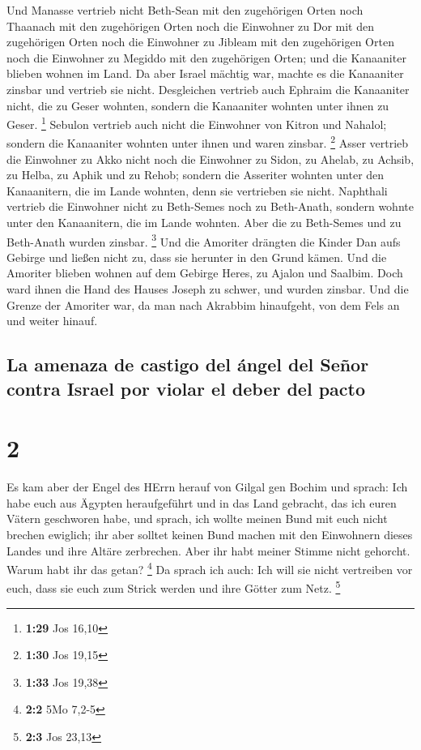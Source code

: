  Und Manasse vertrieb nicht Beth-Sean mit den zugehörigen
Orten noch Thaanach mit den zugehörigen Orten noch die Einwohner zu Dor
mit den zugehörigen Orten noch die Einwohner zu Jibleam mit den
zugehörigen Orten noch die Einwohner zu Megiddo mit den zugehörigen
Orten; und die Kanaaniter blieben wohnen im Land.  Da
aber Israel mächtig war, machte es die Kanaaniter zinsbar und vertrieb
sie nicht.  Desgleichen vertrieb auch Ephraim die
Kanaaniter nicht, die zu Geser wohnten, sondern die Kanaaniter wohnten
unter ihnen zu Geser. \footnote{\textbf{1:29} Jos 16,10} 
Sebulon vertrieb auch nicht die Einwohner von Kitron und Nahalol;
sondern die Kanaaniter wohnten unter ihnen und waren zinsbar.
\footnote{\textbf{1:30} Jos 19,15}  Asser vertrieb die
Einwohner zu Akko nicht noch die Einwohner zu Sidon, zu Ahelab, zu
Achsib, zu Helba, zu Aphik und zu Rehob;  sondern die
Asseriter wohnten unter den Kanaanitern, die im Lande wohnten, denn sie
vertrieben sie nicht.  Naphthali vertrieb die Einwohner
nicht zu Beth-Semes noch zu Beth-Anath, sondern wohnte unter den
Kanaanitern, die im Lande wohnten. Aber die zu Beth-Semes und zu
Beth-Anath wurden zinsbar. \footnote{\textbf{1:33} Jos 19,38}
 Und die Amoriter drängten die Kinder Dan aufs Gebirge
und ließen nicht zu, dass sie herunter in den Grund kämen.
 Und die Amoriter blieben wohnen auf dem Gebirge Heres,
zu Ajalon und Saalbim. Doch ward ihnen die Hand des Hauses Joseph zu
schwer, und wurden zinsbar.  Und die Grenze der Amoriter
war, da man nach Akrabbim hinaufgeht, von dem Fels an und weiter hinauf.

\hypertarget{la-amenaza-de-castigo-del-uxe1ngel-del-seuxf1or-contra-israel-por-violar-el-deber-del-pacto}{%
\subsection{La amenaza de castigo del ángel del Señor contra Israel por
violar el deber del
pacto}\label{la-amenaza-de-castigo-del-uxe1ngel-del-seuxf1or-contra-israel-por-violar-el-deber-del-pacto}}

\hypertarget{section-1}{%
\section{2}\label{section-1}}

 Es kam aber der Engel des HErrn herauf von Gilgal gen
Bochim und sprach: Ich habe euch aus Ägypten heraufgeführt und in das
Land gebracht, das ich euren Vätern geschworen habe, und sprach, ich
wollte meinen Bund mit euch nicht brechen ewiglich;  ihr
aber solltet keinen Bund machen mit den Einwohnern dieses Landes und
ihre Altäre zerbrechen. Aber ihr habt meiner Stimme nicht gehorcht.
Warum habt ihr das getan? \footnote{\textbf{2:2} 5Mo 7,2-5}
 Da sprach ich auch: Ich will sie nicht vertreiben vor
euch, dass sie euch zum Strick werden und ihre Götter zum Netz.
\footnote{\textbf{2:3} Jos 23,13}

